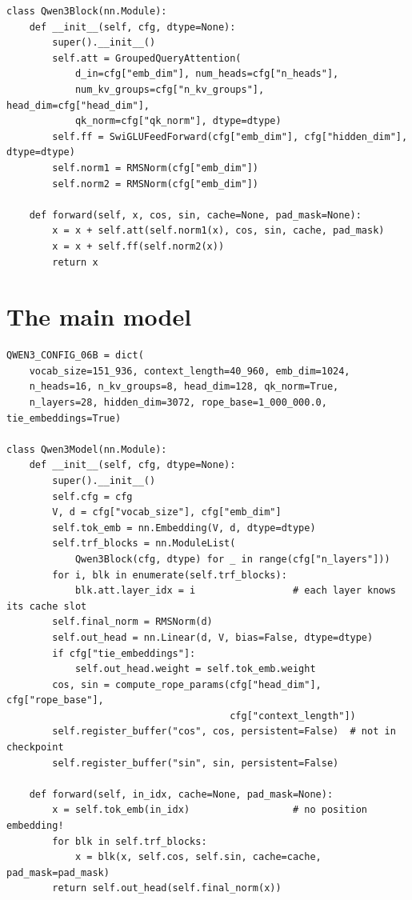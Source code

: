 \begin{lstlisting}[caption={The Qwen3 transformer block.},label={lst:modern:block}]
class Qwen3Block(nn.Module):
    def __init__(self, cfg, dtype=None):
        super().__init__()
        self.att = GroupedQueryAttention(
            d_in=cfg["emb_dim"], num_heads=cfg["n_heads"],
            num_kv_groups=cfg["n_kv_groups"], head_dim=cfg["head_dim"],
            qk_norm=cfg["qk_norm"], dtype=dtype)
        self.ff = SwiGLUFeedForward(cfg["emb_dim"], cfg["hidden_dim"], dtype=dtype)
        self.norm1 = RMSNorm(cfg["emb_dim"])
        self.norm2 = RMSNorm(cfg["emb_dim"])

    def forward(self, x, cos, sin, cache=None, pad_mask=None):
        x = x + self.att(self.norm1(x), cos, sin, cache, pad_mask)
        x = x + self.ff(self.norm2(x))
        return x
\end{lstlisting}

\section{The main model}\label{sec:modern:model}

\begin{lstlisting}[caption={Qwen3 configuration and model (cf.\ \ident{llmsys/qwen3.py}).},label={lst:modern:model}]
QWEN3_CONFIG_06B = dict(
    vocab_size=151_936, context_length=40_960, emb_dim=1024,
    n_heads=16, n_kv_groups=8, head_dim=128, qk_norm=True,
    n_layers=28, hidden_dim=3072, rope_base=1_000_000.0, tie_embeddings=True)

class Qwen3Model(nn.Module):
    def __init__(self, cfg, dtype=None):
        super().__init__()
        self.cfg = cfg
        V, d = cfg["vocab_size"], cfg["emb_dim"]
        self.tok_emb = nn.Embedding(V, d, dtype=dtype)
        self.trf_blocks = nn.ModuleList(
            Qwen3Block(cfg, dtype) for _ in range(cfg["n_layers"]))
        for i, blk in enumerate(self.trf_blocks):
            blk.att.layer_idx = i                 # each layer knows its cache slot
        self.final_norm = RMSNorm(d)
        self.out_head = nn.Linear(d, V, bias=False, dtype=dtype)
        if cfg["tie_embeddings"]:
            self.out_head.weight = self.tok_emb.weight
        cos, sin = compute_rope_params(cfg["head_dim"], cfg["rope_base"],
                                       cfg["context_length"])
        self.register_buffer("cos", cos, persistent=False)  # not in checkpoint
        self.register_buffer("sin", sin, persistent=False)

    def forward(self, in_idx, cache=None, pad_mask=None):
        x = self.tok_emb(in_idx)                  # no position embedding!
        for blk in self.trf_blocks:
            x = blk(x, self.cos, self.sin, cache=cache, pad_mask=pad_mask)
        return self.out_head(self.final_norm(x))
\end{lstlisting}

